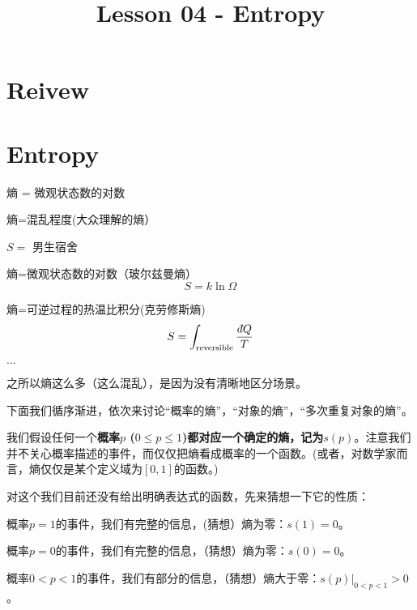 \documentclass[CJK]{beamer}
\title{Lesson 04 - Entropy}
\author{}
\date{}
\begin{document}

\section{Reivew}


\section{Entropy}

\begin{frame}
\bch
{}
\emini
{}
熵 = 微观状态数的对数
\emini
\ech
\end{frame}

\begin{frame}
\bch
\bitem
\item{熵=混乱程度(大众理解的熵）

\begin{center}
$S=$ 男生宿舍
\end{center}
}
\item{熵=微观状态数的对数（玻尔兹曼熵）
$$S = k\ln \Omega$$
}
\item{熵=可逆过程的热温比积分(克劳修斯熵)
$$S = \int_{\rm reversible} \frac{\dbar Q}{T}$$
}
\item{$\ldots$}
\eitem

之所以熵这么多（这么混乱），是因为没有清晰地区分场景。

下面我们循序渐进，依次来讨论“概率的熵”，“对象的熵”，“多次重复对象的熵”。
\ech
\end{frame}

\begin{frame}
\bch
我们假设任何一个{\blue \bf 概率$p$ ($0\le p\le 1$)都对应一个确定的熵，记为$s(p)$}。注意我们并不关心概率描述的事件，而仅仅把熵看成概率的一个函数。(或者，对数学家而言，熵仅仅是某个定义域为$[0,1]$的函数。)

\skipline

对这个我们目前还没有给出明确表达式的函数，先来猜想一下它的性质：

\bitem
\item{概率$p=1$的事件，我们有完整的信息，(猜想）熵为零：$s(1) = 0$。}
\item{概率$p=0$的事件，我们有完整的信息，（猜想）熵为零：$s(0) = 0$。}
\item{概率$0<p<1$的事件，我们有部分的信息，（猜想）熵大于零：$s(p)|_{0<p<1} > 0$。}
\eitem

\ech
\end{frame}
\end{document}
